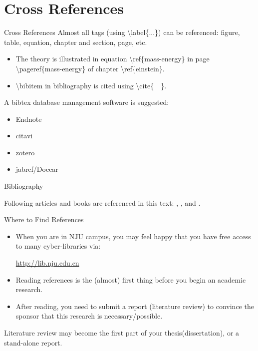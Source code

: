 \documentclass[10pt]{beamer}
\begin{document}
\section{Cross References}
\begin{frame}[t]{Cross References}
    Almost all tags (using \textbackslash label\{...\})
    can be referenced: figure, table, equation,
    chapter and section, page, etc.
\begin{itemize}
    \item The theory is illustrated in equation
        \alert{\textbackslash ref\{mass-energy\}} in page
        \alert{\textbackslash pageref\{mass-energy\}} of chapter
        \alert{\textbackslash ref\{einstein\}}.

    \item \textbackslash bibitem in bibliography is cited using
        \textbackslash cite\{\ \ \}.
\end{itemize}
A bibtex database management software is suggested:
\begin{itemize}
    \item Endnote
    \item citavi
    \item zotero
    \item jabref/Docear
\end{itemize}
\end{frame}

\begin{frame}{Bibliography}

 Following articles and books are referenced in this text:
    \cite{Knuth_texbook}, \cite{texmanual}, \cite{David_tex_land} and
    \cite{oetiker2015}.

    
    
\end{frame}

\begin{frame}[t]{Where to Find References}
\begin{itemize}
    \item When you are in NJU campus, you may feel happy that you have
    free access to many cyber-libraries via:

    \url{http://lib.nju.edu.cn} \\[2ex]
    \item Reading references is the (almost) first thing before
        you begin an academic research.
    \item After reading, you need to submit a report (literature review)
        to convince the sponsor that this research is necessary/possible.
\end{itemize}
Literature review may become the first part of your thesis(dissertation),
or a stand-alone report.
\end{frame}
\end{document}
